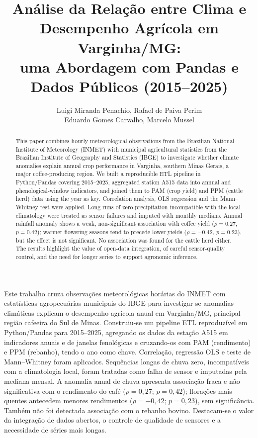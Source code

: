 \documentclass[12pt]{article}
\title{An{\'a}lise da Rela{\c{c}}{\~a}o entre Clima e\\ Desempenho Agr{\'i}cola em Varginha/MG:\\ uma Abordagem com Pandas e Dados P{\'u}blicos (2015--2025)}
\author{
  Luigi Miranda Penachio\inst{1}, Rafael de Paiva Perim\inst{1}\\
  Eduardo Gomes Carvalho\inst{1}, Marcelo Mussel\inst{1}
}
\begin{document}
\maketitle

\begin{abstract}
  This paper combines hourly meteorological observations from the Brazilian
  National Institute of Meteorology (INMET) with municipal agricultural
  statistics from the Brazilian Institute of Geography and Statistics (IBGE)
  to investigate whether climate anomalies explain annual crop performance in
  Varginha, southern Minas Gerais, a major coffee-producing region. We built a
  reproducible ETL pipeline in Python/Pandas covering 2015--2025, aggregated
  station A515 data into annual and phenological-window indicators, and joined
  them to PAM (crop yield) and PPM (cattle herd) data using the year as key.
  Correlation analysis, OLS regression and the Mann--Whitney test were applied.
  Long runs of zero precipitation incompatible with the local climatology were
  treated as sensor failures and imputed with monthly medians. Annual rainfall
  anomaly shows a weak, non-significant association with coffee yield
  ($\rho=0.27$, $p=0.42$); warmer flowering seasons tend to precede lower yields
  ($\rho=-0.42$, $p=0.23$), but the effect is not significant. No association was
  found for the cattle herd either. The results highlight the value of open-data
  integration, of careful sensor-quality control, and the need for longer series
  to support agronomic inference.
\end{abstract}

\begin{resumo}
  Este trabalho cruza observa{\c{c}}{\~o}es meteorol{\'o}gicas hor{\'a}rias do INMET com
  estat{\'i}sticas agropecu{\'a}rias municipais do IBGE para investigar se anomalias
  clim{\'a}ticas explicam o desempenho agr{\'i}cola anual em Varginha/MG, principal
  regi{\~a}o cafeeira do Sul de Minas. Construiu-se um pipeline ETL reproduz{\'i}vel em
  Python/Pandas para 2015--2025, agregando os dados da esta{\c{c}}{\~a}o A515 em
  indicadores anuais e de janelas fenol{\'o}gicas e cruzando-os com PAM (rendimento)
  e PPM (rebanho), tendo o ano como chave. Correla{\c{c}}{\~a}o, regress{\~a}o OLS e teste
  de Mann--Whitney foram aplicados. Sequ{\^e}ncias longas de chuva zero,
  incompat{\'i}veis com a climatologia local, foram tratadas como falha de sensor
  e imputadas pela mediana mensal. A anomalia anual de chuva apresenta
  associa{\c{c}}{\~a}o fraca e n{\~a}o significativa com o rendimento do caf{\'e}
  ($\rho=0,27$; $p=0,42$); flora{\c{c}}{\~o}es mais quentes antecedem menores rendimentos
  ($\rho=-0,42$; $p=0,23$), sem signific{\^a}ncia. Tamb{\'e}m n{\~a}o foi detectada
  associa{\c{c}}{\~a}o com o rebanho bovino. Destacam-se o valor da integra{\c{c}}{\~a}o de
  dados abertos, o controle de qualidade de sensores e a necessidade de s{\'e}ries
  mais longas.
\end{resumo}
\end{document}
